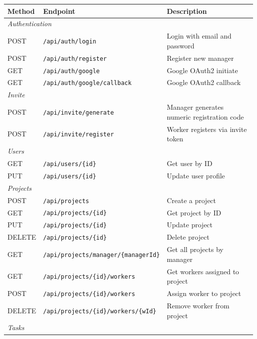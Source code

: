 \documentclass[12pt,a4paper]{article}
\begin{document}
\begin{longtable}{lll}
\toprule
\textbf{Method} & \textbf{Endpoint} & \textbf{Description} \\
\midrule
\endhead
\multicolumn{3}{l}{\textit{Authentication}} \\
POST   & \texttt{/api/auth/login}                         & Login with email and password \\
POST   & \texttt{/api/auth/register}                     & Register new manager \\
GET    & \texttt{/api/auth/google}                       & Google OAuth2 initiate \\
GET    & \texttt{/api/auth/google/callback}              & Google OAuth2 callback \\
\midrule
\multicolumn{3}{l}{\textit{Invite}} \\
POST   & \texttt{/api/invite/generate}                   & Manager generates numeric registration code \\
POST   & \texttt{/api/invite/register}                   & Worker registers via invite token \\
\midrule
\multicolumn{3}{l}{\textit{Users}} \\
GET    & \texttt{/api/users/\{id\}}                      & Get user by ID \\
PUT    & \texttt{/api/users/\{id\}}                      & Update user profile \\
\midrule
\multicolumn{3}{l}{\textit{Projects}} \\
POST   & \texttt{/api/projects}                          & Create a project \\
GET    & \texttt{/api/projects/\{id\}}                   & Get project by ID \\
PUT    & \texttt{/api/projects/\{id\}}                   & Update project \\
DELETE & \texttt{/api/projects/\{id\}}                   & Delete project \\
GET    & \texttt{/api/projects/manager/\{managerId\}}    & Get all projects by manager \\
GET    & \texttt{/api/projects/\{id\}/workers}           & Get workers assigned to project \\
POST   & \texttt{/api/projects/\{id\}/workers}           & Assign worker to project \\
DELETE & \texttt{/api/projects/\{id\}/workers/\{wId\}}  & Remove worker from project \\
\midrule
\multicolumn{3}{l}{\textit{Tasks}} \\

\end{longtable}
\end{document}
